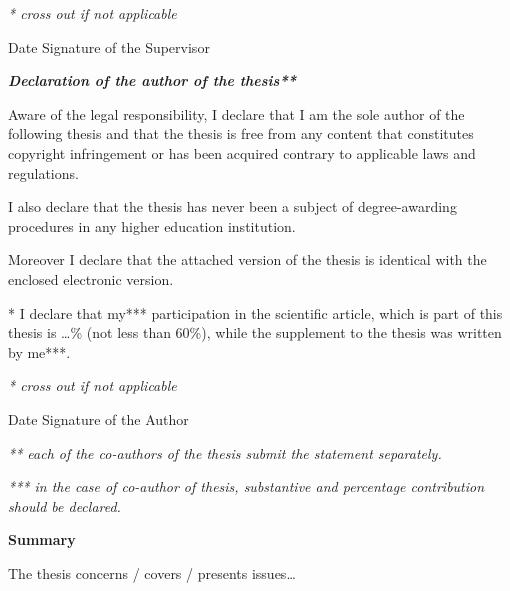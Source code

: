 \documentclass[12pt,a4paper]{article}
\begin{document}
\vspace{0.5\baselineskip}
{\small\textit{* cross out if not applicable}}

\vspace{2\baselineskip}
\noindent Date \hfill Signature of the Supervisor
\vspace{2\baselineskip}

\begin{center}\textbf{\textit{Declaration of the author of the thesis**}}\end{center}
\vspace{0.5\baselineskip}

Aware of the legal responsibility, I declare that I am the sole author of the
following thesis and that the thesis is free from any content that constitutes
copyright infringement or has been acquired contrary to applicable laws and
regulations.

I also declare that the thesis has never been a subject of degree-awarding
procedures in any higher education institution.

Moreover I declare that the attached version of the thesis is identical with
the enclosed electronic version.

* I declare that my*** participation in the scientific article, which is part
of this thesis is \dots\% (not less than 60\%), while the supplement to the
thesis was written by me***.

\vspace{0.5\baselineskip}
{\small\textit{* cross out if not applicable}}

\vspace{2\baselineskip}
\noindent Date \hfill Signature of the Author

\vspace{\baselineskip}
{\small\textit{** each of the co-authors of the thesis submit the statement separately.}\par
\textit{*** in the case of co-author of thesis, substantive and percentage
contribution should be declared.}}

\clearpage
\begin{center}\textbf{Summary}\end{center}
\vspace{0.5\baselineskip}
\noindent   %
The thesis concerns / covers / presents issues\dots
\end{document}
